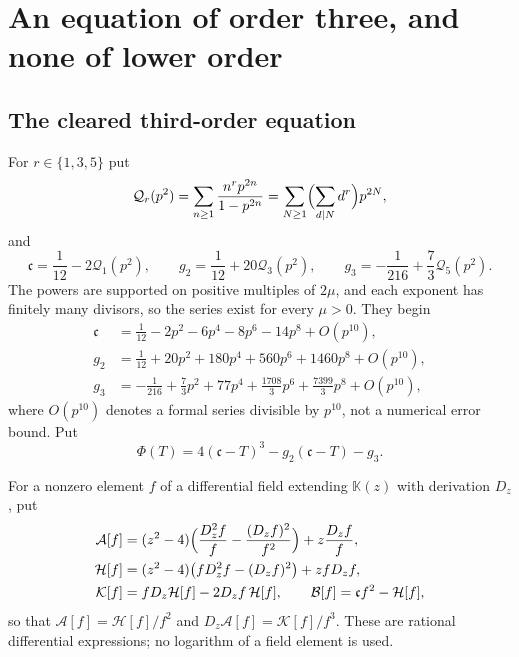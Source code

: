 \documentclass[11pt]{article}
\numberwithin{equation}{section}
\theoremstyle{definition}
\theoremstyle{remark}
\newcommand{\KK}{\mathbb K}
\begin{document}
\section{An equation of order three, and none of lower order}
\label{hol:td:sec:order}

\subsection{The cleared third-order equation}\label{hol:td:sub:ode}

For $r\in\{1,3,5\}$ put
\begin{equation}\label{hol:td:eq:lambert}
 \mathcal Q_r(p^2)=\sum_{n\ge1}\frac{n^rp^{2n}}{1-p^{2n}}
 =\sum_{N\ge1}\Bigl(\sum_{d\mid N}d^r\Bigr)p^{2N},
\end{equation}
and
\begin{equation}\label{hol:td:eq:constants}
 \mathfrak c=\frac1{12}-2\mathcal Q_1(p^2),\qquad
 g_2=\frac1{12}+20\mathcal Q_3(p^2),\qquad
 g_3=-\frac1{216}+\frac73\mathcal Q_5(p^2).
\end{equation}
The powers are supported on positive multiples of $2\mu$, and each exponent
has finitely many divisors, so the series exist for every $\mu>0$. They begin
\begin{align*}
 \mathfrak c&=\tfrac1{12}-2p^2-6p^4-8p^6-14p^8+O(p^{10}),\\
 g_2&=\tfrac1{12}+20p^2+180p^4+560p^6+1460p^8+O(p^{10}),\\
 g_3&=-\tfrac1{216}+\tfrac73p^2+77p^4+\tfrac{1708}3p^6+\tfrac{7399}3p^8
 +O(p^{10}),
\end{align*}
where $O(p^{10})$ denotes a formal series divisible by $p^{10}$, not a
numerical error bound. Put
\begin{equation}\label{hol:td:eq:Phi}
 \Phi(T)=4(\mathfrak c-T)^3-g_2(\mathfrak c-T)-g_3 .
\end{equation}

For a nonzero element $f$ of a differential field extending $\KK(z)$ with
derivation $D_z$, put
\begin{align}
 \mathcal A[f]&=(z^2-4)\Bigl(\frac{D_z^2f}f-\frac{(D_zf)^2}{f^2}\Bigr)
 +z\frac{D_zf}f,\label{hol:td:eq:A}\\
 \mathcal H[f]&=(z^2-4)\bigl(fD_z^2f-(D_zf)^2\bigr)+zfD_zf,
 \label{hol:td:eq:H}\\
 \mathcal K[f]&=fD_z\mathcal H[f]-2D_zf\,\mathcal H[f],\qquad
 \mathcal B[f]=\mathfrak cf^2-\mathcal H[f],\label{hol:td:eq:KB}
\end{align}
so that $\mathcal A[f]=\mathcal H[f]/f^2$ and
$D_z\mathcal A[f]=\mathcal K[f]/f^3$. These are rational differential
expressions; no logarithm of a field element is used.
\end{document}
